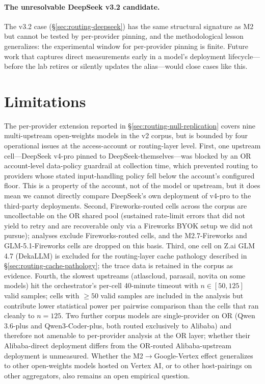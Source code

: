 \documentclass[11pt,a4paper]{article}
\begin{document}
\paragraph{The unresolvable DeepSeek v3.2 candidate.} The v3.2 case (\S\ref{sec:routing-deepseek}) has the same structural signature as M2 but cannot be tested by per-provider pinning, and the methodological lesson generalizes: the experimental window for per-provider pinning is finite. Future work that captures direct measurements early in a model's deployment lifecycle---before the lab retires or silently updates the alias---would close cases like this.

\section{Limitations}
\label{sec:limitations}

The per-provider extension reported in \S\ref{sec:routing-null-replication} covers nine multi-upstream open-weights models in the v2 corpus, but is bounded by four operational issues at the access-account or routing-layer level. First, one upstream cell---DeepSeek v4-pro pinned to DeepSeek-themselves---was blocked by an OR account-level data-policy guardrail at collection time, which prevented routing to providers whose stated input-handling policy fell below the account's configured floor. This is a property of the account, not of the model or upstream, but it does mean we cannot directly compare DeepSeek's own deployment of v4-pro to the third-party deployments. Second, Fireworks-routed cells across the corpus are uncollectable on the OR shared pool (sustained rate-limit errors that did not yield to retry and are recoverable only via a Fireworks BYOK setup we did not pursue); analyses exclude Fireworks-routed cells, and the M2.7-Fireworks and GLM-5.1-Fireworks cells are dropped on this basis. Third, one cell on Z.ai GLM 4.7 (DekaLLM) is excluded for the routing-layer cache pathology described in \S\ref{sec:routing-cache-pathology}; the trace data is retained in the corpus as evidence. Fourth, the slowest upstreams (atlascloud, parasail, novita on some models) hit the orchestrator's per-cell 40-minute timeout with $n \in [50, 125]$ valid samples; cells with $\geq 50$ valid samples are included in the analysis but contribute lower statistical power per pairwise comparison than the cells that ran cleanly to $n{=}125$. Two further corpus models are single-provider on OR (Qwen 3.6-plus and Qwen3-Coder-plus, both routed exclusively to Alibaba) and therefore not amenable to per-provider analysis at the OR layer; whether their Alibaba-direct deployment differs from the OR-routed Alibaba-upstream deployment is unmeasured. Whether the M2$\rightarrow$Google-Vertex effect generalizes to other open-weights models hosted on Vertex AI, or to other host-pairings on other aggregators, also remains an open empirical question.
\end{document}
